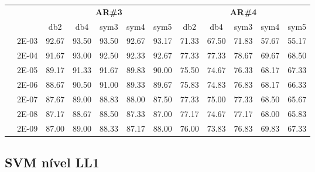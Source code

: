 \begin{table}[H]
\begin{tabular}{|c|c|c c c c c|c c c c c|}
\cline{3-12}
\multicolumn{2}{c}{} & \multicolumn{5}{|c|}{\textbf{AR\#3}}  & \multicolumn{5}{c|}{\textbf{AR\#4}} \\\cline{3-12}
\multicolumn{2}{c}{}  & \multicolumn{1}{|c}{db2} & db4 & sym3 & sym4 & sym5 & db2 & db4& sym3 & sym4 & sym5 \\\hline
\multicolumn{1}{|c|}{ \multirow{6}{*}{\rotatebox[origin=c]{90}{\textbf{Sigma}}} }
&2E-03&	92.67&	93.50&	93.50&	92.67&	93.17&	71.33&	67.50&	71.83&	57.67&	55.17	\\\cline{2-12}
&2E-04&	91.67&	93.00&	92.50&	92.33&	92.67&	77.33&	77.33&	78.67&	69.67&	68.50	\\\cline{2-12}
&2E-05&	89.17&	91.33&	91.67&	89.83&	90.00&	75.50&	74.67&	76.33&	68.17&	67.33	\\\cline{2-12}
&2E-06&	88.67&	90.50&	91.00&	89.33&	89.67&	75.83&	74.83&	76.83&	68.17&	66.33	\\\cline{2-12}
&2E-07&	87.67&	89.00&	88.83&	88.00&	87.50&	77.33&	75.00&	77.33&	68.50&	65.67	\\\cline{2-12}
&2E-08&	87.17&	88.67&	88.50&	87.33&	87.00&	77.17&	74.67&	77.17&	68.00&	65.83	\\\cline{2-12}
&2E-09&	87.00&	89.00&	88.33&	87.17&	88.00&	76.00&	73.83&	76.83&	69.83&	67.33	
\\\midrule
\end{tabular}
\end{table}


\subsection{SVM nível LL1}

